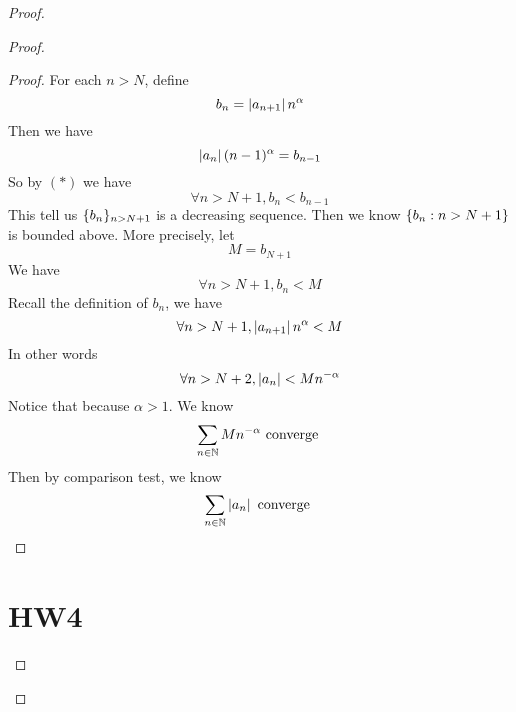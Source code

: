 \documentclass{report}
\begin{document}
\begin{proof}
\begin{proof}
\begin{proof}
For each $n>N$, define
 \begin{equation}
b_n=\left|a_{n+1}\right|n^{\alpha }
\end{equation}
Then we have
\begin{equation}
\left|a_n\right|(n-1)^{\alpha }=b_{n-1}
\end{equation}
So by $(*)$ we have
\begin{equation}
\forall n>N+1, b_n<b_{n-1}
\end{equation}
This tell us $\{ b_n \}_{n>N+1}$ is a decreasing sequence. Then we know $\{ b_n:n>N+1 \}$ is bounded above. More precisely, let
\begin{equation}
M=b_{N+1}
\end{equation}
We have
\begin{equation}
\forall n>N+1, b_n< M
\end{equation}
Recall the definition of $b_n$, we have
 \begin{equation}
\forall n>N+1, \left|a_{n+1}\right|n^{\alpha }<M
\end{equation}
In other words
\begin{equation}
\forall n>N+2, \left|a_n\right|<Mn^{-\alpha }
\end{equation}
Notice that because $\alpha>1 $. We know 
\begin{equation}
\sum_{n\in\mathbb{N}} Mn^{-\alpha }\text{ converge }
\end{equation}
Then by comparison test, we know
\begin{equation}
\sum_{n\in\mathbb{N}} \left|a_n\right|\text{ converge }
\end{equation}

\end{proof}

\section{HW4}


\end{proof}
\end{proof}
\end{document}
